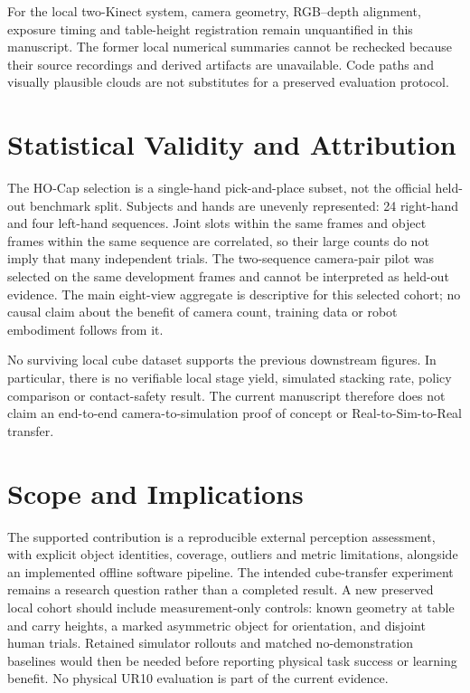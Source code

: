 For the local two-Kinect system, camera geometry, RGB--depth alignment,
exposure timing and table-height registration remain unquantified in
this manuscript. The former local numerical summaries cannot be
rechecked because their source recordings and derived artifacts are
unavailable. Code paths and visually plausible clouds are not
substitutes for a preserved evaluation protocol.

\section{Statistical Validity and Attribution}
\label{sec:validity}

The HO-Cap selection is a single-hand pick-and-place subset, not the
official held-out benchmark split. Subjects and hands are unevenly
represented: 24 right-hand and four left-hand sequences. Joint slots
within the same frames and object frames within the same sequence
are correlated, so their large counts do not imply that many
independent trials. The two-sequence camera-pair pilot was selected
on the same development frames and cannot be interpreted as held-out
evidence. The main eight-view aggregate is descriptive for this
selected cohort; no causal claim about the benefit of camera count,
training data or robot embodiment follows from it.

No surviving local cube dataset supports the previous downstream
figures. In particular, there is no verifiable local stage yield,
simulated stacking rate, policy comparison or contact-safety result.
The current manuscript therefore does not claim an end-to-end
camera-to-simulation proof of concept or Real-to-Sim-to-Real transfer.

\section{Scope and Implications}
\label{sec:implications}

The supported contribution is a reproducible external perception
assessment, with explicit object identities, coverage, outliers and
metric limitations, alongside an implemented offline software
pipeline. The intended cube-transfer experiment remains a research
question rather than a completed result. A new preserved local
cohort should include measurement-only controls: known geometry at
table and carry heights, a marked asymmetric object for orientation,
and disjoint human trials. Retained simulator rollouts and matched
no-demonstration baselines would then be needed before reporting
physical task success or learning benefit. No physical UR10
evaluation is part of the current evidence.
